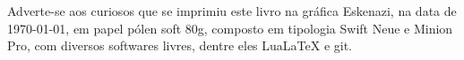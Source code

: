 \pagebreak

\ifodd\thepage\blankpage\fi

\parindent=0pt
\footnotesize\thispagestyle{empty}









\mbox{}\vfill
\begin{center}
		\begin{minipage}{.7\textwidth}\tiny\noindent{}
		\centering\tiny
		Adverte-se aos curiosos que se imprimiu este 
		livro na gráfica Eskenazi, 
		na data de \today, em papel pólen soft 80g, composto em tipologia Swift Neue e Minion Pro, com diversos softwares livres, 
		dentre eles Lua\LaTeX{} e git.\\ 
		\medskip\\\
		\end{minipage}
\end{center}